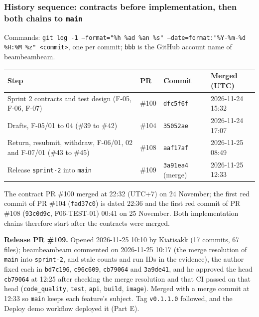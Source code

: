 \subsubsection*{History sequence: contracts before implementation, then both chains to \texttt{main}}

Commands: \texttt{git log -1 --format="\%h  \%ad  \%an  \%s" --date=format:"\%Y-\%m-\%d \%H:\%M \%z" <commit>}, one per commit; \texttt{bbb} is the GitHub account name of beambeambeam.


\begin{center}\small
\begin{tabular}{@{}p{7.2cm}lll@{}}
\toprule \textbf{Step} & \textbf{PR} & \textbf{Commit} & \textbf{Merged (UTC)} \\ \midrule
Sprint 2 contracts and test design (F-05, F-06, F-07) & \#100 & \texttt{dfc5f6f} & 2026-11-24 15:32 \\
Drafts, F-05/01 to 04 (\#39 to \#42) & \#104 & \texttt{35052ae} & 2026-11-24 17:07 \\
Return, resubmit, withdraw, F-06/01, 02 and F-07/01 (\#43 to \#45) & \#108 & \texttt{aaf17af} & 2026-11-25 08:49 \\
Release \texttt{sprint-2} into \texttt{main} & \#109 & \texttt{3a91ea4} (merge) & 2026-11-25 12:33 \\
\bottomrule
\end{tabular}
\end{center}

The contract PR \#100 merged at 22:32 (UTC+7) on 24 November; the first red commit of PR \#104 (\texttt{fad37c0}) is dated 22:36 and the first red commit of PR \#108 (\texttt{93c0d9c}, F06-TEST-01) 00:41 on 25 November. Both implementation chains therefore start after the contracts were merged.

\textbf{Release PR \#109.} Opened 2026-11-25 10:10 by Kiatisakk (17 commits, 67 files); beambeambeam commented on 2026-11-25 10:17 (the merge resolution of \texttt{main} into \texttt{sprint-2}, and stale counts and run IDs in the evidence), the author fixed each in \texttt{bd7c196}, \texttt{c96c609}, \texttt{cb79064} and \texttt{3a9de41}, and he approved the head \texttt{cb79064} at 12:25 after checking the merge resolution and that CI passed on that head (\texttt{code\_quality}, \texttt{test}, \texttt{api}, \texttt{build}, \texttt{image}). Merged with a merge commit at 12:33 so \texttt{main} keeps each feature's subject. Tag \texttt{v0.1.1.0} followed, and the Deploy demo workflow deployed it (Part E).

